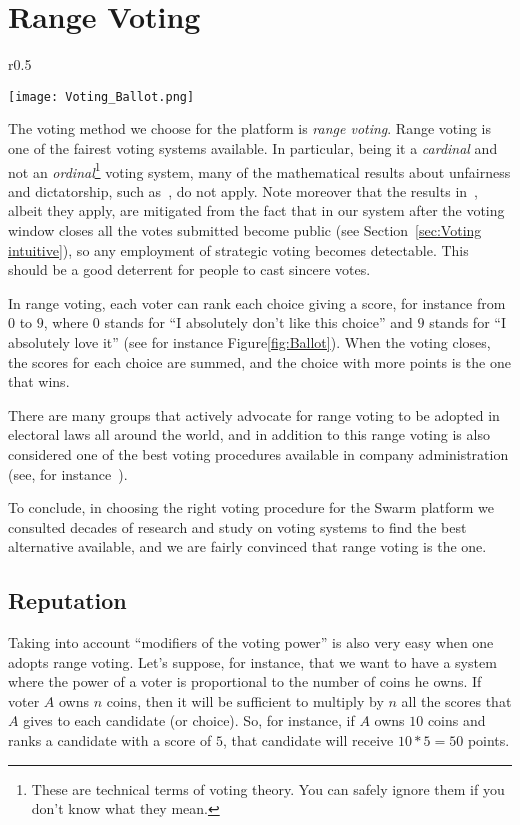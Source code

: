 \documentclass[submission, copyright,creativecommons,sharealike,noncommercial]{eptcs}
\begin{document}
\section{Range Voting}\label{sec:Range voting}
	\begin{wrapfigure}{r}{0.5\textwidth}
		\vspace{-10pt}
		\begin{center}
			\texttt{[image: Voting\_Ballot.png]}
		\end{center}
		\vspace{-15pt}
		\caption{Range voting ballot [source: Wikipedia]}\label{fig:Ballot}
		\vspace{-5pt}
	\end{wrapfigure}
%
	The voting method we choose for the platform is \emph{range voting}. Range voting is one of the fairest voting systems available. In particular, being it a \emph{cardinal} and not an \emph{ordinal}\footnote{These are technical terms of voting theory. You can safely ignore them if you don't know what they mean.} voting system, many of the mathematical results about unfairness and dictatorship, such as~\cite{Arrow1951, Satterthwaite1975}, do not apply. Note moreover that the results in~\cite{Gibbard1973}, albeit they apply, are mitigated from the fact that in our system after the voting window closes all the votes submitted become public (see Section~\ref{sec:Voting intuitive}), so any employment of strategic voting becomes detectable. This should be a good deterrent for people to cast sincere votes.
	
	In range voting, each voter can rank each choice giving a score, for instance from $0$ to $9$, where $0$ stands for ``I absolutely don't like this choice'' and $9$ stands for ``I absolutely love it'' (see for instance Figure\ref{fig:Ballot}). When the voting closes, the scores for each choice are summed, and the choice with more points is the one that wins.
	
	There are many groups that actively advocate for range voting to be adopted in electoral laws all around the world, and in addition to this range voting is also considered one of the best voting procedures available in company administration (see, for instance~\cite{Electology, RangeVoting}). 
	
	To conclude, in choosing the right voting procedure for the Swarm platform we consulted decades of research and study on voting systems to find the best alternative available, and we are fairly convinced that range voting is the one.
%
%	
\subsection{Reputation}\label{subsec:Reputation}
%
	Taking into account ``modifiers of the voting power'' is also very easy when one adopts range voting. Let's suppose, for instance, that we want to have a system where the power of a voter is proportional to the number of coins he owns. If voter $A$ owns $n$ coins, then it will be sufficient to multiply by $n$ all the scores that $A$ gives to each candidate (or choice). So, for instance, if $A$ owns $10$ coins and ranks a candidate with a score of $5$, that candidate will receive $10*5=50$ points.
	
\end{document}
